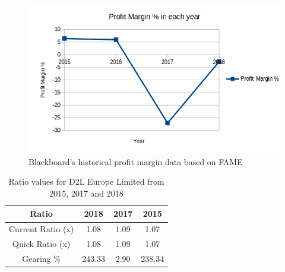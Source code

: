 \documentclass[]{article}
\begin{document}
\begin{figure}
    \centering
    \includegraphics[width =1.2\linewidth]{profit margin.png}
    \caption{Blackboard's historical profit margin data based on FAME \cite{FAME-Blackboard}}
    \label{fig:BB-Profit-Margin}
\end{figure}

\begin{table}
\centering
\begin{tabular}{||c | c | c | c||} 
\hline
Ratio & 2018 & 2017 & 2015 \\ [0.5ex] 
\hline\hline
Current Ratio (x) & 1.08 & 1.09 & 1.07 \\ 
\hline
Quick Ratio (x) & 1.08 & 1.09 & 1.07 \\ 
\hline
Gearing \% & 243.33 & 2.90 & 238.34 \\ 
\hline
\end{tabular}
\caption{Ratio values for D2L Europe Limited from 2015, 2017 and 2018 \cite{FAME-D2L}}
\label{tab:Ratios-D2L}
\end{table}
\end{document}
